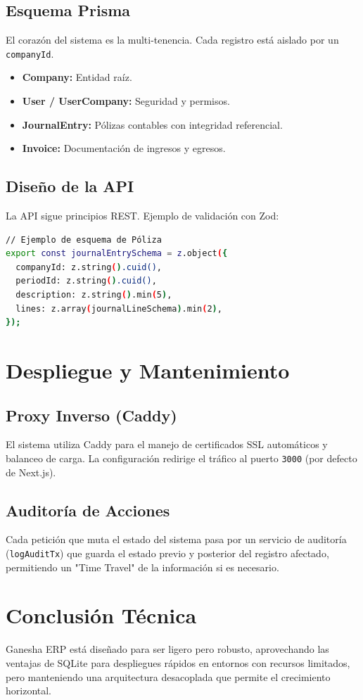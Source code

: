 \documentclass[12pt]{report}
\begin{document}
\section{Esquema Prisma}
El corazón del sistema es la multi-tenencia. Cada registro está aislado por un \texttt{companyId}.
\begin{tcolorbox}[colback=white, colframe=DevBlue, title=Entidades Principales]
    \begin{itemize}
        \item \textbf{Company:} Entidad raíz.
        \item \textbf{User / UserCompany:} Seguridad y permisos.
        \item \textbf{JournalEntry:} Pólizas contables con integridad referencial.
        \item \textbf{Invoice:} Documentación de ingresos y egresos.
    \end{itemize}
\end{tcolorbox}

\section{Diseño de la API}
La API sigue principios REST. Ejemplo de validación con Zod:
\begin{lstlisting}[language=bash]
// Ejemplo de esquema de Póliza
export const journalEntrySchema = z.object({
  companyId: z.string().cuid(),
  periodId: z.string().cuid(),
  description: z.string().min(5),
  lines: z.array(journalLineSchema).min(2),
});
\end{lstlisting}

\chapter{Despliegue y Mantenimiento}

\section{Proxy Inverso (Caddy)}
El sistema utiliza Caddy para el manejo de certificados SSL automáticos y balanceo de carga. La configuración redirige el tráfico al puerto \texttt{3000} (por defecto de Next.js).

\section{Auditoría de Acciones}
Cada petición que muta el estado del sistema pasa por un servicio de auditoría (\texttt{logAuditTx}) que guarda el estado previo y posterior del registro afectado, permitiendo un "Time Travel" de la información si es necesario.

\chapter{Conclusión Técnica}
Ganesha ERP está diseñado para ser ligero pero robusto, aprovechando las ventajas de SQLite para despliegues rápidos en entornos con recursos limitados, pero manteniendo una arquitectura desacoplada que permite el crecimiento horizontal.
\end{document}
